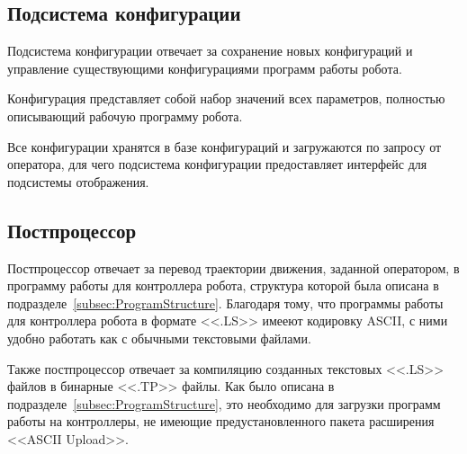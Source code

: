 \subsection{Подсистема конфигурации}
Подсистема конфигурации отвечает за сохранение новых конфигураций и управление существующими конфигурациями программ работы робота.

Конфигурация представляет собой набор значений всех параметров, полностью описывающий рабочую программу робота.

Все конфигурации хранятся в базе конфигураций и загружаются по запросу от оператора, для чего подсистема конфигурации предоставляет интерфейс для подсистемы отображения.

\subsection{Постпроцессор}
Постпроцессор отвечает за перевод траектории движения, заданной оператором, в программу работы для контроллера робота, структура которой была описана в подразделе~\ref{subsec:ProgramStructure}.
Благодаря тому, что программы работы для контроллера робота в формате <<.LS>> имееют кодировку ASCII, с ними удобно работать как с обычными текстовыми файлами.

Также постпроцессор отвечает за компиляцию созданных текстовых <<.LS>> файлов в бинарные <<.TP>> файлы.
Как было описана в подразделе~\ref{subsec:ProgramStructure}, это необходимо для загрузки программ работы на контроллеры, не имеющие предустановленного пакета расширения <<ASCII Upload>>.
